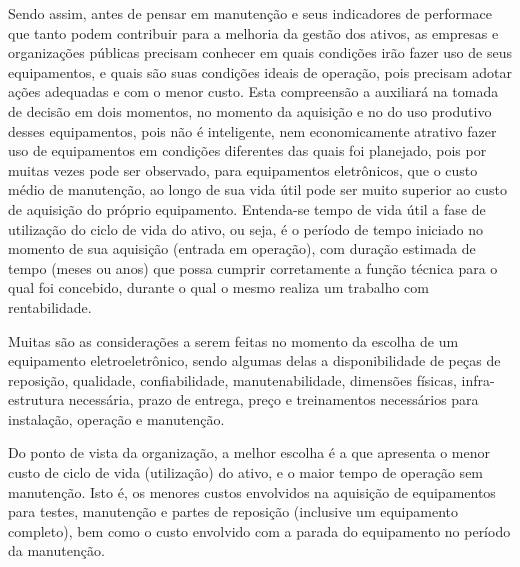 Sendo assim, antes de pensar em manutenção e seus indicadores de performace que tanto podem contribuir para a melhoria da gestão dos ativos, as empresas e organizações públicas precisam conhecer em quais condições irão fazer uso de seus equipamentos, e quais são suas condições ideais de operação, pois precisam adotar ações adequadas e com o menor custo. Esta compreensão a auxiliará na tomada de decisão em dois momentos, no momento da aquisição e no do uso produtivo desses equipamentos, pois não é inteligente, nem economicamente atrativo fazer uso de equipamentos em condições diferentes das quais foi planejado, pois por muitas vezes pode ser observado, para equipamentos eletrônicos, que o custo médio de manutenção, ao longo de sua vida útil pode ser muito superior ao custo de aquisição do próprio equipamento. Entenda-se tempo de vida útil a fase de utilização do ciclo de vida do ativo, ou seja, é o período de tempo iniciado no momento de sua aquisição (entrada em operação), com duração estimada de tempo (meses ou anos) que possa cumprir corretamente a função técnica para o qual foi concebido, durante o qual o mesmo realiza um trabalho com rentabilidade. 

Muitas são as considerações a serem feitas no momento da escolha de um equipamento eletroeletrônico, sendo algumas delas a disponibilidade de peças de reposição, qualidade, confiabilidade, manutenabilidade, dimensões físicas, infra-estrutura necessária, prazo de entrega, preço e treinamentos necessários para instalação, operação e manutenção. 

Do ponto de vista da organização, a melhor escolha é a que apresenta o menor custo de ciclo de vida (utilização) do ativo, e o maior tempo de operação sem manutenção. Isto é, os menores custos envolvidos na aquisição de equipamentos para testes, manutenção e partes de reposição (inclusive um equipamento completo), bem como o custo envolvido com a parada do equipamento no período da manutenção.
